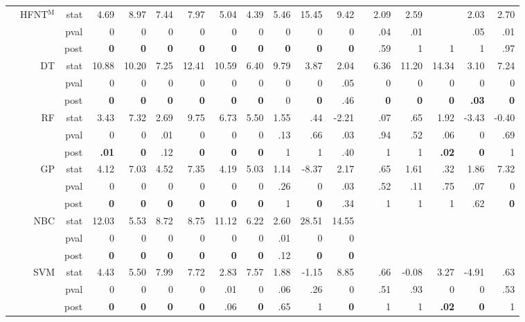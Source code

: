 \documentclass[11pt,a4paper]{article}
\begin{document}
\begin{table}
\begin{tabular}[t]{lrrrrrrrrrrrrrrrrr}
&HFNT$^{\text{M}}$ & stat & 4.69 & 8.97 & 7.44 & 7.97 & 5.04 & 4.39 & 5.46 & 15.45 & 9.42 &  & 2.09 & 2.59 &  & 2.03 & 2.70 \\
            & & pval & 0 & 0 & 0 & 0 & 0 & 0 & 0 & 0 & 0 &  & .04 & .01 &  & .05 & .01 \\
            & & post & \textbf{0} & \textbf{0} & \textbf{0} & \textbf{0} & \textbf{0} & \textbf{0} & \textbf{0} & \textbf{0} & \textbf{0} &  & .59 & 1 & 1 & 1 & .97 \\
& DT & stat & 10.88 & 10.20 & 7.25 & 12.41 & 10.59 & 6.40 & 9.79 & 3.87 & 2.04 &  & 6.36 & 11.20 & 14.34 & 3.10 & 7.24 \\
            &  & pval & 0 & 0 & 0 & 0 & 0 & 0 & 0 & 0 & .05 &  & 0 & 0 & 0 & 0 & 0 \\
            &  & post & \textbf{0} & \textbf{0} & \textbf{0} & \textbf{0} & \textbf{0} & \textbf{0} & 0 & \textbf{0} & .46 &  & \textbf{0} & \textbf{0} & \textbf{0} & \textbf{.03} & \textbf{0} \\
& RF & stat & 3.43 & 7.32 & 2.69 & 9.75 & 6.73 & 5.50 & 1.55 & .44 & -2.21 &  & .07 & .65 & 1.92 & -3.43 & -0.40 \\
            & & pval & 0 & 0 & .01 & 0 & 0 & 0 & .13 & .66 & .03 &  & .94 & .52 & .06 & 0 & .69 \\
            & & post & \textbf{.01} & \textbf{0} & .12 & \textbf{0} & \textbf{0} & \textbf{0} & 1 & 1 & .40 &  & 1 & 1 & \textbf{.02} & \textbf{0} & 1 \\
\cmidrule{1-2}
            \parbox[t]{3mm}{}
            & GP & stat & 4.12 & 7.03 & 4.52 & 7.35 & 4.19 & 5.03 & 1.14 & -8.37 & 2.17 &  & .65 & 1.61 & .32 & 1.86 & 7.32 \\
            &  & pval & 0 & 0 & 0 & 0 & 0 & 0 & .26 & 0 & .03 &  & .52 & .11 & .75 & .07 & 0 \\
            &  & post & \textbf{0} & \textbf{0} & \textbf{0} & \textbf{0} & \textbf{0} & \textbf{0} & 1 & \textbf{0} & .34 &  & 1 & 1 & 1 & .62 & \textbf{0} \\
& NBC & stat & 12.03 & 5.53 & 8.72 & 8.75 & 11.12 & 6.22 & 2.60 & 28.51 & 14.55 &  &  &  &  &  &  \\
            &  & pval & 0 & 0 & 0 & 0 & 0 & 0 & .01 & 0 & 0 &  &  &  &  &  &  \\
            &  & post & \textbf{0} & \textbf{0} & \textbf{0} & \textbf{0} & \textbf{0} & \textbf{0} & .12 & \textbf{0} & \textbf{0} &  &  &  &  &  &  \\
& SVM & stat & 4.43 & 5.50 & 7.99 & 7.72 & 2.83 & 7.57 & 1.88 & -1.15 & 8.85 &  & .66 & -0.08 & 3.27 & -4.91 & .63 \\
            &  & pval & 0 & 0 & 0 & 0 & .01 & 0 & .06 & .26 & 0 &  & .51 & .93 & 0 & 0 & .53 \\
            &  & post & \textbf{0} & \textbf{0} & \textbf{0} & \textbf{0} & .06 & \textbf{0} & .65 & 1 & \textbf{0} &  & 1 & 1 & \textbf{.02} & \textbf{0} & 1 \\
            \bottomrule
        \end{tabular}
    \end{table}
    
\end{document}
